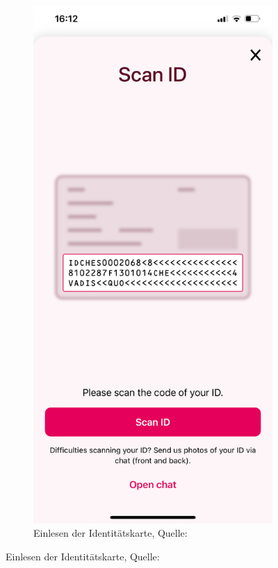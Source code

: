 \begin{figure}[h]
	\begin{subfigure}[b]{0.4\textwidth}
		\includegraphics[scale=0.15]{images/ID-Scan.PNG}
		\caption[Einlesen der Identitätskarte]{Einlesen der Identitätskarte, Quelle: \cite{avecApp}}

\end{subfigure}
\end{figure}
